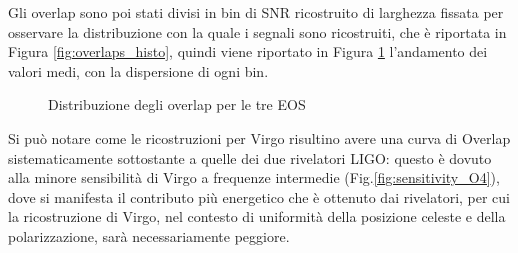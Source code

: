 Gli overlap sono poi stati divisi in bin di SNR ricostruito di larghezza fissata per osservare la distribuzione con la quale i segnali sono ricostruiti, che è riportata in Figura \ref{fig:overlaps_histo}, quindi viene riportato in Figura \ref{fig:Overlap_distribution} l'andamento dei valori medi, con la dispersione di ogni bin.\\
\begin{figure}[ht]
	\vspace{-5pt}
	\centering
	\vspace{-5pt}
	\caption{Distribuzione degli overlap per le tre EOS}
	\label{fig:Overlap_distribution}
	\vspace{-15pt}
\end{figure}
Si può notare come le ricostruzioni per Virgo risultino avere una curva di Overlap sistematicamente sottostante a quelle dei due rivelatori LIGO: questo è dovuto alla minore sensibilità di Virgo a frequenze intermedie (Fig.\ref{fig:sensitivity_O4}), dove si manifesta il contributo più energetico che è ottenuto dai rivelatori, per cui la ricostruzione di Virgo, nel contesto di uniformità della posizione celeste e della polarizzazione, sarà necessariamente peggiore.

